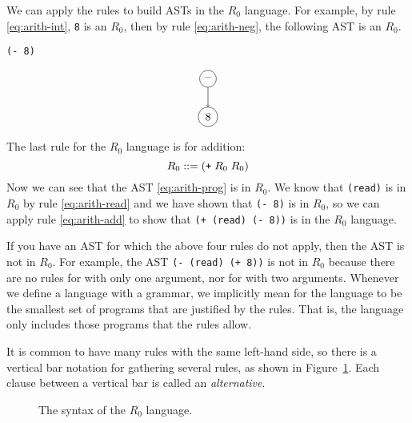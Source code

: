 \documentclass[11pt]{book}
\begin{document}
We can apply the rules to build ASTs in the $R_0$
language. For example, by rule \eqref{eq:arith-int}, \texttt{8} is an
$R_0$, then by rule \eqref{eq:arith-neg}, the following AST is
an $R_0$.
\begin{center}
\begin{minipage}{0.25\textwidth}
\begin{lstlisting}
(- 8)
\end{lstlisting}
\end{minipage}
\begin{minipage}{0.25\textwidth}
\begin{equation}
\begin{tikzpicture}
 \node[draw, circle] (minus) at (0, 0)  {$\text{--}$};
 \node[draw, circle] (8)     at (0, -1.2) {$8$};

 \draw[->] (minus) to (8);
\end{tikzpicture}
\label{eq:arith-neg8}
\end{equation}
\end{minipage}
\end{center}

The last rule for the $R_0$ language is for addition:
\begin{equation}
  R_0 ::= (\texttt{+} \; R_0 \; R_0) \label{eq:arith-add}
\end{equation}
Now we can see that the AST \eqref{eq:arith-prog} is in $R_0$.
We know that \lstinline{(read)} is in $R_0$ by rule
\eqref{eq:arith-read} and we have shown that \texttt{(- 8)} is in
$R_0$, so we can apply rule \eqref{eq:arith-add} to show that
\texttt{(+ (read) (- 8))} is in the $R_0$ language.

If you have an AST for which the above four rules do not apply, then
the AST is not in $R_0$. For example, the AST \texttt{(-
  (read) (+ 8))} is not in $R_0$ because there are no rules
for \key{+} with only one argument, nor for \key{-} with two
arguments.  Whenever we define a language with a grammar, we
implicitly mean for the language to be the smallest set of programs
that are justified by the rules. That is, the language only includes
those programs that the rules allow.

It is common to have many rules with the same left-hand side, so there
is a vertical bar notation for gathering several rules, as shown in
Figure~\ref{fig:r0-syntax}. Each clause between a vertical bar is
called an {\em alternative}.

\begin{figure}[tbp]
\caption{The syntax of the $R_0$ language.}
\label{fig:r0-syntax}
\end{figure}
\end{document}
